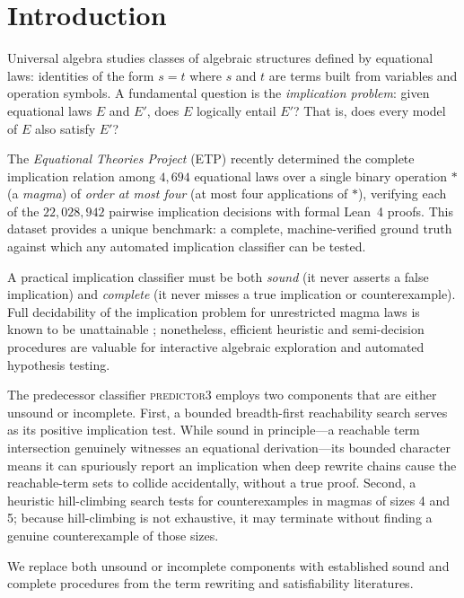 \section{Introduction}
\label{sec:intro}

Universal algebra studies classes of algebraic structures defined by equational
laws: identities of the form $s = t$ where $s$ and $t$ are terms built from
variables and operation symbols.  A fundamental question is the \emph{implication
problem}: given equational laws $E$ and $E'$, does $E$ logically entail $E'$?
That is, does every model of $E$ also satisfy $E'$?

The \emph{Equational Theories Project} (ETP) \cite{etp2025} recently determined
the complete implication relation among $4{,}694$ equational laws over a single
binary operation $*$ (a \emph{magma}) of \emph{order at most four} (at most four
applications of $*$), verifying each of the $22{,}028{,}942$ pairwise implication
decisions with formal Lean~4 proofs.  This dataset provides a unique benchmark:
a complete, machine-verified ground truth against which any automated implication
classifier can be tested.

A practical implication classifier must be both \emph{sound} (it never asserts
a false implication) and \emph{complete} (it never misses a true implication or
counterexample).  Full decidability of the implication problem for unrestricted
magma laws is known to be unattainable \cite{mckenzie1971spectra}; nonetheless,
efficient heuristic and semi-decision procedures are valuable for interactive
algebraic exploration and automated hypothesis testing.

The predecessor classifier \textsc{predictor3} employs two components that are
either unsound or incomplete.  First, a bounded breadth-first reachability search
serves as its positive implication test.  While sound in principle---a reachable
term intersection genuinely witnesses an equational derivation---its bounded
character means it can spuriously report an implication when deep rewrite chains
cause the reachable-term sets to collide accidentally, without a true proof.
Second, a heuristic hill-climbing search tests for counterexamples in magmas of
sizes 4 and 5; because hill-climbing is not exhaustive, it may terminate without
finding a genuine counterexample of those sizes.

We replace both unsound or incomplete components with established sound and
complete procedures from the term rewriting and satisfiability literatures.

